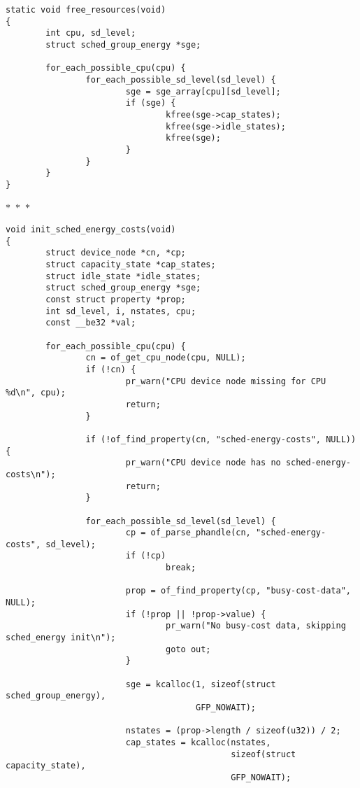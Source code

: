 \documentclass{article}
\newcommand{\divider}{{\begin{center}
  $\ast$~$\ast$~$\ast$
\end{center}}}
\begin{document}
\begin{verbatim}
static void free_resources(void)
{
        int cpu, sd_level;
        struct sched_group_energy *sge;

        for_each_possible_cpu(cpu) {
                for_each_possible_sd_level(sd_level) {
                        sge = sge_array[cpu][sd_level];
                        if (sge) {
                                kfree(sge->cap_states);
                                kfree(sge->idle_states);
                                kfree(sge);
                        }
                }
        }
}
\end{verbatim}
\divider
\begin{verbatim}
void init_sched_energy_costs(void)
{
        struct device_node *cn, *cp;
        struct capacity_state *cap_states;
        struct idle_state *idle_states;
        struct sched_group_energy *sge;
        const struct property *prop;
        int sd_level, i, nstates, cpu;
        const __be32 *val;

        for_each_possible_cpu(cpu) {
                cn = of_get_cpu_node(cpu, NULL);
                if (!cn) {
                        pr_warn("CPU device node missing for CPU %d\n", cpu);
                        return;
                }

                if (!of_find_property(cn, "sched-energy-costs", NULL)) {
                        pr_warn("CPU device node has no sched-energy-costs\n");
                        return;
                }

                for_each_possible_sd_level(sd_level) {
                        cp = of_parse_phandle(cn, "sched-energy-costs", sd_level);
                        if (!cp)
                                break;

                        prop = of_find_property(cp, "busy-cost-data", NULL);
                        if (!prop || !prop->value) {
                                pr_warn("No busy-cost data, skipping sched_energy init\n");
                                goto out;
                        }

                        sge = kcalloc(1, sizeof(struct sched_group_energy),
                                      GFP_NOWAIT);

                        nstates = (prop->length / sizeof(u32)) / 2;
                        cap_states = kcalloc(nstates,
                                             sizeof(struct capacity_state),
                                             GFP_NOWAIT);


\end{verbatim}
\end{document}
